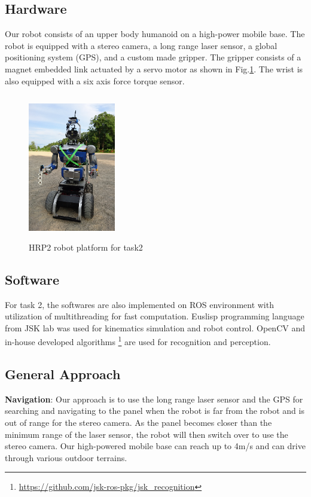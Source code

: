 \documentclass{standalone}
\begin{document}
\subsection{Hardware}
Our robot consists of an upper body humanoid on a high-power mobile base. The robot is equipped with a stereo camera, a long range laser sensor, a global positioning system (GPS), and a custom made gripper. The gripper consists of a magnet embedded link actuated by a servo motor as shown in Fig.\ref{fig:figure1}. The wrist is also equipped with a six axis force torque sensor. 


\begin{figure}
  \includegraphics[height=2.5in, width=1.5in]{sections/task2/images/figure1}
  \caption{HRP2 robot platform for task2}
  \label{fig:figure1}
\end{figure}

\subsection{Software}

For task 2, the softwares are also implemented on ROS environment with utilization of multithreading for fast computation. Euslisp programming language from JSK lab was used for kinematics simulation and robot control. OpenCV and in-house developed algorithms
 \footnote{\url{https://github.com/jsk-ros-pkg/jsk_recognition}} are used for recognition and perception.


 \subsection{General Approach}
 \textbf{Navigation}: Our approach is to use the long range laser sensor and the GPS for searching and navigating to the panel when the robot is far from the robot and is out of range for the stereo camera. As the panel becomes closer than the minimum range of the laser sensor, the robot will then switch over to use the stereo camera. Our high-powered mobile base can reach up to 4m/s and can drive through various outdoor terrains. 
\end{document}
